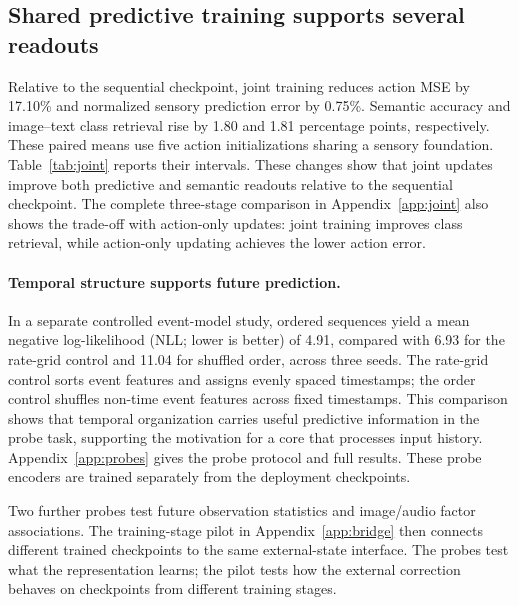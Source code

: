 \subsection{Shared predictive training supports several readouts}
Relative to the sequential checkpoint, joint training reduces action MSE by
17.10\% and normalized sensory prediction error by 0.75\%. Semantic accuracy
and image--text class retrieval rise by 1.80 and 1.81 percentage points,
respectively. These paired means use five action initializations
sharing a sensory foundation. Table~\ref{tab:joint} reports their intervals.
These changes show that joint updates improve both predictive and semantic
readouts relative to the sequential checkpoint. The complete three-stage comparison
in Appendix~\ref{app:joint} also shows the trade-off with action-only updates:
joint training improves class retrieval, while action-only updating achieves
the lower action error.


\paragraph{Temporal structure supports future prediction.}
\label{sec:temporal_evidence}
In a separate controlled event-model study, ordered sequences yield a mean
negative log-likelihood (NLL; lower is better) of 4.91, compared with 6.93 for
the rate-grid control and 11.04 for shuffled order, across three seeds.
The rate-grid control sorts event features and assigns evenly spaced timestamps;
the order control shuffles non-time event features across fixed timestamps.
This comparison shows that temporal organization carries useful predictive
information in the probe task, supporting the motivation for a core that
processes input history. Appendix~\ref{app:probes} gives the probe protocol
and full results. These probe encoders are trained separately from the
deployment checkpoints.

Two further probes test future observation statistics and image/audio factor
associations. The training-stage pilot in
Appendix~\ref{app:bridge} then connects different trained checkpoints to the
same external-state interface. The probes test what the representation learns; the pilot tests how the
external correction behaves on checkpoints from different training stages.
